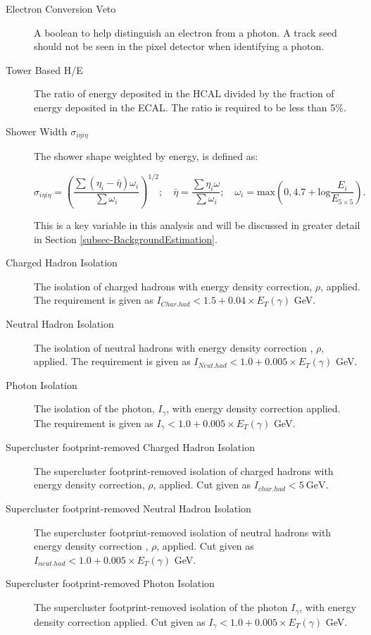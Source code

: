 \begin{description}

\item[Electron Conversion Veto] A boolean to help distinguish an electron from a photon. A track seed should not be seen in the pixel detector when identifying a photon. 

\item[Tower Based H/E] The ratio of energy deposited in the HCAL divided by the fraction of energy deposited in the ECAL. The ratio is required to be less than 5\%.

\item[Shower Width $\sigma_{i\eta i\eta}$] The shower shape weighted by energy, is defined as: 

\begin{equation}
\sigma_{i\eta i\eta} = \left(\frac{\sum(\eta_i - \bar{\eta})\omega_i}{\sum\omega_i}\right)^{1/2}; \quad \bar{\eta} = \frac{\sum\eta_i\omega}{\sum\omega_i}; \quad  \omega_i = \text{max}\left(0, 4.7 +
\text{log}\frac{E_i}{E_{5\times5}}\right).
\end{equation}

This is a key variable in this analysis and will be discussed in greater detail in Section \ref{subsec-BackgroundEstimation}.

\item[Charged Hadron Isolation] The isolation of charged hadrons with energy density correction, $\rho$, applied. The requirement is given as $I_{Char.had} < 1.5 + 0.04 \times E_T(\gamma)$ GeV. 

\item[Neutral Hadron Isolation] The isolation of neutral hadrons with energy density correction , $\rho$, applied. The requirement is given as $I_{Neut.had} < 1.0 + 0.005 \times E_T(\gamma)$ GeV. 

\item[Photon Isolation] The isolation of the photon, $I_{\gamma}$, with energy density correction applied. The requirement is given as $I_{\gamma} < 1.0 + 0.005 \times E_T(\gamma)$ GeV.


\item[Supercluster footprint-removed Charged Hadron Isolation] The supercluster footprint-removed isolation of charged hadrons with energy density correction, $\rho$, applied.
Cut given as $I_{char.had} < 5 \ \text{GeV} $. 

\item[Supercluster footprint-removed Neutral Hadron Isolation] The supercluster footprint-removed isolation of neutral hadrons with energy density correction , $\rho$, applied.
Cut given as $I_{neut.had} < 1.0 + 0.005 \times E_T(\gamma)$ GeV. 

\item[Supercluster footprint-removed Photon Isolation] The supercluster footprint-removed isolation of the photon $I_{\gamma}$, with energy density correction applied. Cut given
as $I_{\gamma} < 1.0 + 0.005 \times E_T(\gamma)$ GeV. 

\end{description}

